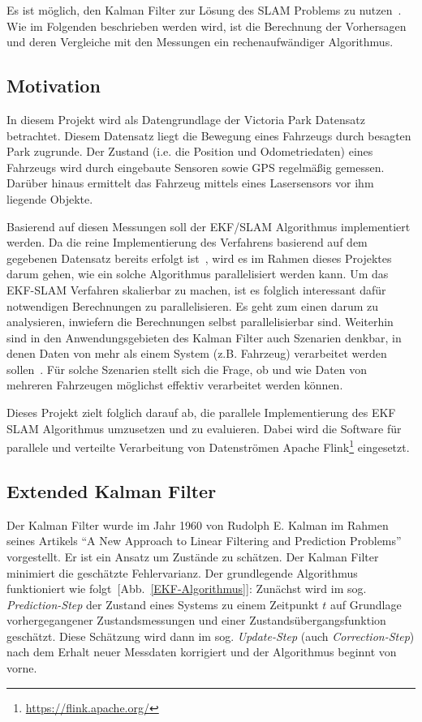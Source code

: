 \documentclass[11pt]{scrartcl}
\begin{document}
Es ist möglich, den Kalman Filter zur Lösung des  SLAM Problems zu nutzen~\cite{freiburg_SLAM}. Wie im Folgenden beschrieben werden wird, ist die Berechnung der Vorhersagen und deren Vergleiche mit den Messungen ein rech\-en\-auf\-wän\-di\-ger Algorithmus.

\subsection{Motivation}
In diesem Projekt wird als Datengrundlage der Victoria Park Datensatz betrachtet. Diesem Datensatz liegt die Bewegung eines Fahrzeugs durch besagten Park zugrunde. Der Zustand (i.e. die Position und Odometriedaten) eines Fahrzeugs wird durch eingebaute Sensoren sowie GPS regelmäßig gemessen. Darüber hinaus ermittelt das Fahrzeug mittels eines Lasersensors vor ihm liegende Objekte.

Basierend auf diesen Messungen soll der EKF/SLAM Algorithmus implementiert werden. Da die reine Implementierung des Verfahrens basierend auf dem gegebenen Datensatz bereits erfolgt ist~\cite{ute_SLAM}, wird es im Rahmen dieses Projektes darum gehen, wie ein solche Algorithmus parallelisiert werden kann. Um das EKF-SLAM Verfahren skalierbar zu machen, ist es folglich interessant dafür notwendigen Berechnungen zu parallelisieren. Es geht zum einen darum zu analysieren, inwiefern die Berechnungen selbst parallelisierbar sind. Weiterhin sind in den Anwendungsgebieten des Kalman Filter auch Szenarien denkbar, in denen Daten von mehr als einem System (z.B. Fahrzeug) verarbeitet werden sollen~\cite{vessel}. Für solche Szenarien stellt sich die Frage, ob  und wie Daten von mehreren Fahrzeugen möglichst effektiv verarbeitet werden können.

Dieses Projekt zielt folglich darauf ab, die parallele Implementierung des EKF SLAM Algorithmus umzusetzen und zu evaluieren. Dabei wird die Software für parallele und verteilte Verarbeitung von Datenströmen Apache Flink\footnote{\url{https://flink.apache.org/}} eingesetzt.

\subsection{Extended Kalman Filter}
Der Kalman Filter wurde im Jahr 1960 von Rudolph E. Kalman im Rahmen seines Artikels “A New Approach to Linear Filtering and Prediction Problems”~\cite{kalman1960new} vorgestellt. Er ist ein Ansatz um Zustände zu schätzen. Der Kalman Filter minimiert die geschätzte Fehlervarianz. Der grundlegende Algorithmus funktioniert wie folgt~[Abb.~\ref{EKF-Algorithmus}]: Zunächst wird im sog. \textit{Prediction-Step} der Zustand eines Systems zu einem Zeitpunkt $t$ auf Grundlage vorhergegangener Zustands\-messungen und einer Zustands\-übergangs\-funktion geschätzt. Diese Schätzung wird dann im sog. \textit{Update-Step} (auch \textit{Correction-Step}) nach dem Erhalt neuer Messdaten korrigiert und der Algorithmus beginnt von vorne.
\end{document}
